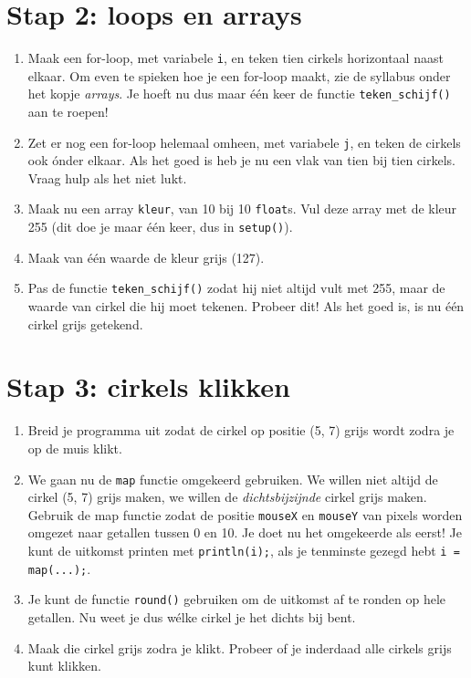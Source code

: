 \documentclass[a4paper,11pt]{article}
\begin{document}
\section{Stap 2: loops en arrays}

\begin{enumerate}
\item Maak een for-loop, met variabele \verb|i|, en teken tien cirkels horizontaal naast elkaar.  Om even te spieken hoe je een for-loop maakt, zie de syllabus onder het kopje \emph{arrays}.  Je hoeft nu dus maar één keer de functie \verb|teken_schijf()| aan te roepen!
\item Zet er nog een for-loop helemaal omheen, met variabele \verb|j|, en teken de cirkels ook ónder elkaar.  Als het goed is heb je nu een vlak van tien bij tien cirkels.  Vraag hulp als het niet lukt.
\item Maak nu een array \verb|kleur|, van 10 bij 10 \verb|float|s.  Vul deze array met de kleur 255 (dit doe je maar één keer, dus in \verb|setup()|).
\item Maak van één waarde de kleur grijs (127).
\item Pas de functie \verb|teken_schijf()| zodat hij niet altijd vult met 255, maar de waarde van cirkel die hij moet tekenen.  Probeer dit!  Als het goed is, is nu één cirkel grijs getekend.
\end{enumerate}


\section{Stap 3: cirkels klikken}

\begin{enumerate}
\item Breid je programma uit zodat de cirkel op positie (5, 7) grijs wordt zodra je op de muis klikt.
\item We gaan nu de \verb|map| functie omgekeerd gebruiken.  We willen niet altijd de cirkel (5, 7) grijs maken, we willen de \emph{dichtsbijzijnde} cirkel grijs maken.  Gebruik de map functie zodat de positie \verb|mouseX| en \verb|mouseY| van pixels worden omgezet naar getallen tussen 0 en 10.  Je doet nu het omgekeerde als eerst!  Je kunt de uitkomst printen met \verb|println(i);|, als je tenminste gezegd hebt \verb|i = map(...);|.
\item Je kunt de functie \verb|round()| gebruiken om de uitkomst af te ronden op hele getallen.  Nu weet je dus wélke cirkel je het dichts bij bent.
\item Maak die cirkel grijs zodra je klikt.  Probeer of je inderdaad alle cirkels grijs kunt klikken.
\end{enumerate}
\end{document}
